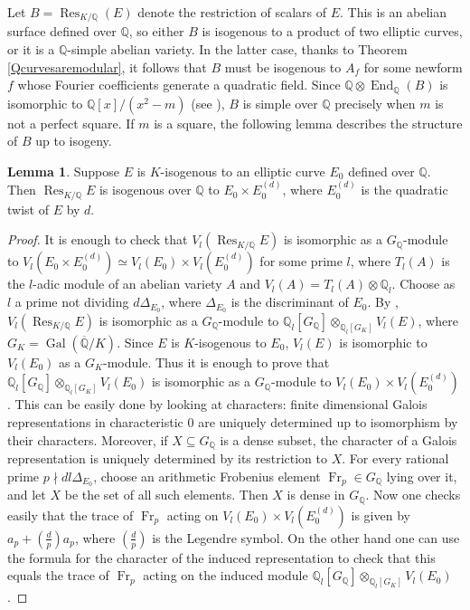 \documentclass[11pt]{amsart}
\theoremstyle{definition}
\newtheorem{lem}[definizione]{Lemma}
\begin{document}
  		Let $B=\operatorname{Res}_{K/{\mathbb{Q}}}(E)$ denote the restriction of scalars of $E$. This is an abelian surface defined over ${\mathbb{Q}}$, so either $B$ is isogenous to a product of two elliptic curves, or it is a ${\mathbb{Q}}$-simple abelian variety. In the latter case, thanks to Theorem \ref{Qcurvesaremodular}, it follows that $B$ must be isogenous to $A_f$ for some newform $f$ whose Fourier coefficients generate a quadratic field. Since ${\mathbb{Q}}\otimes\operatorname{End}_{\mathbb{Q}}(B)$ is isomorphic to ${\mathbb{Q}}[x]/(x^2-m)$ (see \cite{rib1}), $B$ is simple over ${\mathbb{Q}}$ precisely when $m$ is not a perfect square. If $m$ is a square, the following lemma describes the structure of $B$ up to isogeny.
			\begin{lem}
				Suppose $E$ is $K$-isogenous to an elliptic curve $E_0$ defined over ${\mathbb{Q}}$. Then $\operatorname{Res}_{K/{\mathbb{Q}}}E$ is isogenous over ${\mathbb{Q}}$ to $E_0\times E_0^{(d)}$, where $E_0^{(d)}$ is the quadratic twist of $E$ by $d$.
		\end{lem}
			\begin{proof}
				It is enough to check that $V_l(\operatorname{Res}_{K/{\mathbb{Q}}}E)$ is isomorphic as a ${G_{\mathbb{Q}}}$-module to $V_l(E_0\times E_0^{(d)})\simeq V_l(E_0)\times V_l(E_0^{(d)})$ for some prime $l$, where $T_l(A)$ is the $l$-adic module of an abelian variety $A$ and $V_l(A)=T_l(A)\otimes{\mathbb{Q}}_l$. Choose as $l$ a prime not dividing $d\Delta_{E_0}$, where $\Delta_{E_0}$ is the discriminant of $E_0$. By \cite[p. 178]{mil1}, $V_l(\operatorname{Res}_{K/{\mathbb{Q}}}E)$ is isomorphic as a ${G_{\mathbb{Q}}}$-module to ${\mathbb{Q}}_l[{G_{\mathbb{Q}}}]\otimes_{{\mathbb{Q}}_l[G_K]}V_l(E)$, where $G_K=\operatorname{Gal}({\overline{\mathbb{Q}}}/K)$. Since $E$ is $K$-isogenous to $E_0$, $V_l(E)$ is isomorphic to $V_l(E_0)$ as a $G_K$-module. Thus it is enough to prove that ${\mathbb{Q}}_l[{G_{\mathbb{Q}}}]\otimes_{{\mathbb{Q}}_l[G_K]}V_l(E_0)$ is isomorphic as a ${G_{\mathbb{Q}}}$-module to $V_l(E_0)\times V_l(E_0^{(d)})$. This can be easily done by looking at characters: finite dimensional Galois representations in characteristic $0$ are uniquely determined up to isomorphism by their characters. Moreover, if $X{\subseteq} {G_{\mathbb{Q}}}$ is a dense subset, the character of a Galois representation is uniquely determined by its restriction to $X$.  For every rational prime $p\nmid dl\Delta_{E_0}$, choose an arithmetic Frobenius element $\operatorname{Fr}_p\in {G_{\mathbb{Q}}}$ lying over it, and let $X$ be the set of all such elements. Then $X$ is dense in ${G_{\mathbb{Q}}}$. Now one checks easily that the trace of $\operatorname{Fr}_p$ acting on $V_l(E_0)\times V_l(E_0^{(d)})$ is given by $a_p+\left(\frac{d}{p}\right)a_p$, where $\left(\frac{d}{p}\right)$ is the Legendre symbol. On the other hand one can use the formula for the character of the induced representation to check that this equals the trace of $\operatorname{Fr}_p$ acting on the induced module ${\mathbb{Q}}_l[{G_{\mathbb{Q}}}]\otimes_{{\mathbb{Q}}_l[G_K]}V_l(E_0)$.
		\end{proof}
\end{document}
